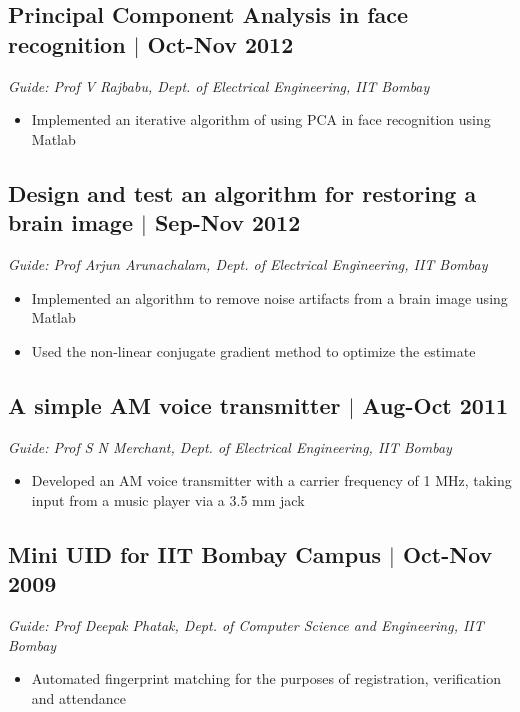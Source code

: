 \documentclass[12pt]{article}
\begin{document}
\subsection*{Principal Component Analysis in face recognition $\vert$  Oct-Nov 2012} 
\emph{Guide: Prof V Rajbabu, Dept. of Electrical Engineering, IIT Bombay}  
\begin{itemize}
\item Implemented an iterative algorithm of using PCA in face recognition using Matlab
\end{itemize}

\subsection*{Design and test an algorithm for restoring a brain image $\vert$  Sep-Nov 2012}
\emph{Guide: Prof Arjun Arunachalam, Dept. of Electrical Engineering, IIT Bombay}  
\begin{itemize}
\item Implemented an algorithm to remove noise artifacts from a brain image using Matlab
\item Used the non-linear conjugate gradient method to optimize the estimate
\end{itemize}

\subsection*{A simple AM voice transmitter $\vert$ Aug-Oct 2011} 
\emph{Guide: Prof S N Merchant, Dept. of Electrical Engineering, IIT Bombay}
\begin{itemize} 
\item Developed an AM voice transmitter with a carrier frequency of 1 MHz, taking input from a music player via a 3.5 mm jack
\end{itemize}


\subsection*{Mini UID for IIT Bombay Campus $\vert$  Oct-Nov 2009}
\emph{Guide: Prof Deepak Phatak, Dept. of Computer Science and Engineering, IIT Bombay} 
\begin{itemize}
\item Automated fingerprint matching for the purposes of registration, verification and attendance
\end{itemize}
\end{document}
